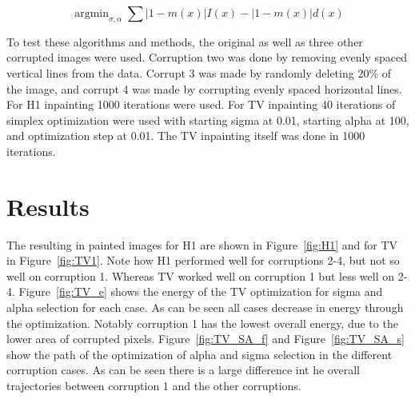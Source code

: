 \documentclass[12pt]{article}
\DeclareMathOperator*{\argmin}{argmin}
\begin{document}
\begin{equation}
\argmin_{\sigma,\alpha} \sum |1-m(x)|I(x) - |1-m(x)|d(x)
\label{EX:opt}
\end{equation}

\par{}
To test these algorithms and methods, the original as well as three other corrupted images were used. Corruption two was done by removing evenly spaced vertical lines from the data. Corrupt 3 was made by randomly deleting 20\% of the image, and corrupt 4 was made by corrupting evenly spaced horizontal lines. For H1 inpainting 1000 iterations were used. For TV inpainting 40 iterations of simplex optimization were used with starting sigma at 0.01, starting alpha at 100, and optimization step at 0.01. The TV inpainting itself was done in 1000 iterations.

\section{Results}
\par{}
The resulting in painted images for H1 are shown in Figure~\ref{fig:H1} and for TV in Figure~\ref{fig:TV1}. Note how H1 performed well for corruptions 2-4, but not so well on corruption 1. Whereas TV worked well on corruption 1 but less well on 2-4. Figure~\ref{fig:TV_e} shows the energy of the TV optimization for sigma and alpha selection for each case. As can be seen all cases decrease in energy through the optimization. Notably corruption 1 has the lowest overall energy, due to the lower area of corrupted pixels. Figure~\ref{fig:TV_SA_f} and Figure~\ref{fig:TV_SA_s} show the path of the optimization of alpha and sigma selection in the different corruption cases. As can be seen there is a large difference int he overall trajectories between corruption 1 and the other corruptions.
\end{document}

